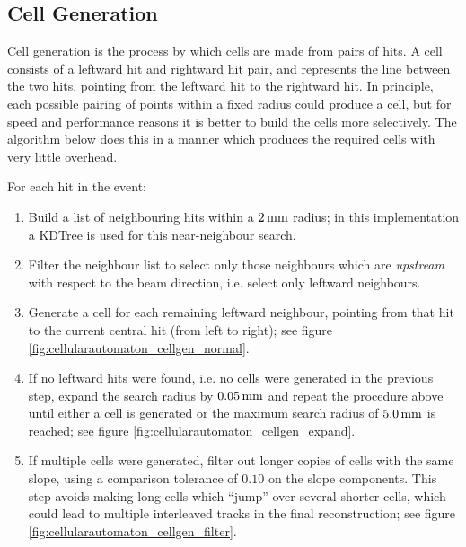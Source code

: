 \subsection{Cell Generation}\label{sec:cellularautomaton_cell_generation}
Cell generation is the process by which cells are made from pairs of hits. A cell consists of a leftward hit and rightward hit pair, and represents the line between the two hits, pointing from the leftward hit to the rightward hit.  In principle, each possible pairing of points within a fixed radius could produce a cell, but for speed and performance reasons it is better to build the cells more selectively. The algorithm below does this in a manner which produces the required cells with very little overhead.

For each hit in the event:
\begin{enumerate}
	\item Build a list of neighbouring hits within a $2\,\mathrm{mm}$ radius; in this implementation a \ac{KDTree} is used for this near-neighbour search.
	\item Filter the neighbour list to select only those neighbours which are \emph{upstream} with respect to the beam direction, i.e. select only leftward neighbours.
	\item Generate a cell for each remaining leftward neighbour, pointing from that hit to the current central hit (from left to right); see figure \ref{fig:cellularautomaton_cellgen_normal}.
	\item If no leftward hits were found, i.e. no cells were generated in the previous step, expand the search radius by $0.05\,\mathrm{mm}$ and repeat the procedure above until either a cell is generated or the maximum search radius of $5.0\,\mathrm{mm}$ is reached; see figure \ref{fig:cellularautomaton_cellgen_expand}.
	\item If multiple cells were generated, filter out longer copies of cells with the same slope, using a comparison tolerance of $0.10$ on the slope components. This step avoids making long cells which ``jump'' over several shorter cells, which could lead to multiple interleaved tracks in the final reconstruction; see figure \ref{fig:cellularautomaton_cellgen_filter}.
\end{enumerate}

